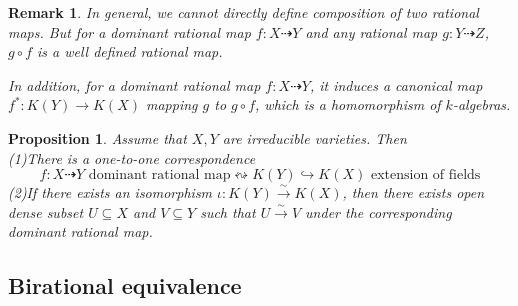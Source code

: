 \documentclass{ctexart}
\newtheorem{remark}{Remark}[section]
\newtheorem{proposition}{Proposition}[section]
\begin{document}
\begin{remark}
    In general, we cannot directly define composition of two rational maps.
    But for a dominant rational map $f: X \dashrightarrow Y$ and any rational map $g: Y \dashrightarrow Z$,
    $g \circ f$ is a well defined rational map.
    \par
    In addition, for a dominant rational map $f: X \dashrightarrow Y$, 
    it induces a canonical map $f^{\ast}: K(Y) \rightarrow K(X)$ mapping $g$ to $g \circ f$, which is a homomorphism of $k$-algebras.
\end{remark}
\begin{proposition}
    Assume that $X, Y$ are irreducible varieties.
    Then \\
    (1)There is a one-to-one correspondence 
    \begin{equation*}
        f: X \dashrightarrow Y \text{ dominant rational map} \leftrightsquigarrow K(Y) \hookrightarrow K(X) \text{ extension of fields}
    \end{equation*}
    (2)If there exists an isomorphism $\iota: K(Y) \overset{\sim}{\rightarrow} K(X)$,
    then there exists open dense subset $U \subseteq X$ and $V \subseteq Y$ such that $U \overset{\sim}{\rightarrow} V$ under the corresponding dominant rational map.
    \label{Proposition 2.3}
\end{proposition}

\subsection{Birational equivalence}
\label{subsection:Projective_Variety_Birational_equivalence}
\end{document}
